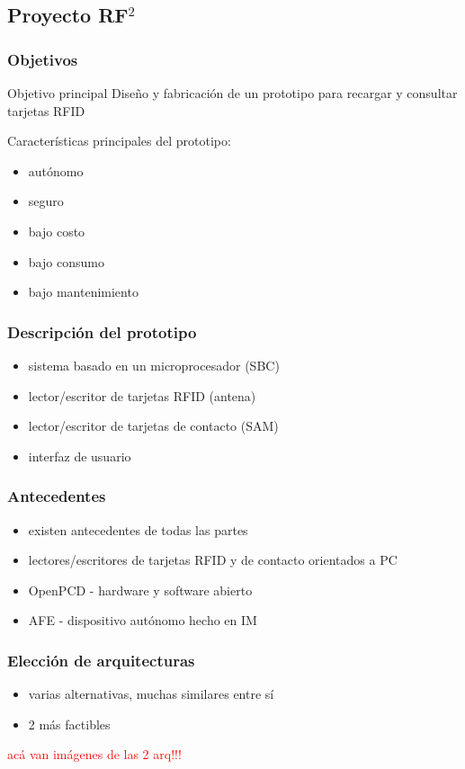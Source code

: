 \documentclass{beamer}
\begin{document}
\subsection{Proyecto RF$^{2}$}
\begin{frame}
	\frametitle{Objetivos}
		\begin{block}{Objetivo principal}		
			Diseño y fabricación de un prototipo para recargar y consultar tarjetas RFID
		\end{block}
		
		Características principales del prototipo:
		\begin{itemize}			
			\item autónomo
			\item seguro
			\item bajo costo
			\item bajo consumo
			\item bajo mantenimiento
		\end{itemize}

\end{frame}

\begin{frame}
	\frametitle{Descripción del prototipo}
	\begin{itemize}
		\item sistema basado en un microprocesador (SBC)
		\item lector/escritor de tarjetas RFID (antena)
		\item lector/escritor de tarjetas de contacto (SAM)
		\item interfaz de usuario
	\end{itemize}
\end{frame}

\begin{frame}
	\frametitle{Antecedentes}
	\begin{itemize}
		\item existen antecedentes de todas las partes
		\item lectores/escritores de tarjetas RFID y de contacto orientados a PC 
		\item OpenPCD - hardware y software abierto
		\item AFE - dispositivo autónomo hecho en IM
	\end{itemize}	
\end{frame}

\begin{frame}
	\frametitle{Elección de arquitecturas}
	\begin{itemize}
		\item varias alternativas, muchas similares entre sí
		\item 2 más factibles
	\end{itemize}
	\textcolor{red}{acá van imágenes de las 2 arq!!!}
	
\end{frame}
\end{document}
